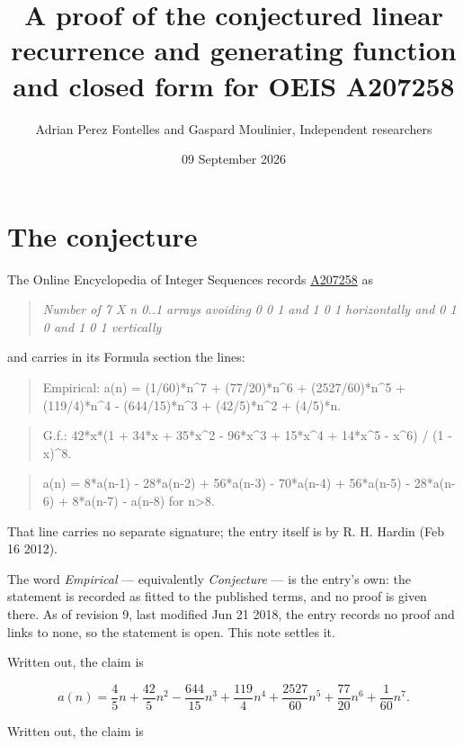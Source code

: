 \documentclass[11pt]{article}
\title{A proof of the conjectured linear recurrence and generating function and closed form for OEIS A207258}
\author{Adrian Perez Fontelles and Gaspard Moulinier, Independent researchers}
\date{09 September 2026}
\theoremstyle{definition}
\begin{document}
\maketitle
\section{The conjecture}

The Online Encyclopedia of Integer Sequences records \href{https://oeis.org/A207258}{A207258} as

\begin{quote}\itshape Number of 7 X n 0..1 arrays avoiding 0 0 1 and 1 0 1 horizontally and 0 1 0 and 1 0 1 vertically\end{quote}

and carries in its Formula section the lines:

\begin{quote}\ttfamily Empirical: a(n) = (1/60)*n\textasciicircum{}7 + (77/20)*n\textasciicircum{}6 + (2527/60)*n\textasciicircum{}5 + (119/4)*n\textasciicircum{}4 - (644/15)*n\textasciicircum{}3 + (42/5)*n\textasciicircum{}2 + (4/5)*n.\end{quote}

\begin{quote}\ttfamily G.f.: 42*x*(1 + 34*x + 35*x\textasciicircum{}2 - 96*x\textasciicircum{}3 + 15*x\textasciicircum{}4 + 14*x\textasciicircum{}5 - x\textasciicircum{}6) / (1 - x)\textasciicircum{}8.\end{quote}

\begin{quote}\ttfamily a(n) = 8*a(n-1) - 28*a(n-2) + 56*a(n-3) - 70*a(n-4) + 56*a(n-5) - 28*a(n-6) + 8*a(n-7) - a(n-8) for n>8.\end{quote}

That line carries no separate signature; the entry itself is by R. H. Hardin (Feb 16 2012).

The word {\itshape Empirical} --- equivalently {\itshape Conjecture} --- is the entry's own: the statement is recorded as fitted to the published terms, and no proof is given there. As of revision 9, last modified Jun 21 2018, the entry records no proof and links to none, so the statement is open. This note settles it.

Written out, the claim is

\[a(n) = \frac{4}{5}n + \frac{42}{5}n^{2} - \frac{644}{15}n^{3} + \frac{119}{4}n^{4} + \frac{2527}{60}n^{5} + \frac{77}{20}n^{6} + \frac{1}{60}n^{7}.\]

Written out, the claim is
\end{document}
